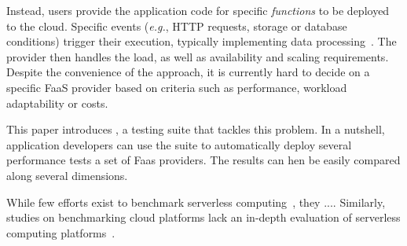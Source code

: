 Instead, users provide the application code for specific \emph{functions} to be deployed to the cloud.
Specific events (\emph{e.g.}, \gls{HTTP} requests, storage or database conditions) trigger their execution, typically implementing data processing~\cite{AWSLambda, GoogleFunctions}.
The provider then handles the load, as well as availability and scaling requirements. %
Despite the convenience of the approach, it is currently hard to decide on a specific FaaS provider based on criteria such as performance, workload adaptability or costs.

This paper introduces \sys, a testing suite that tackles this problem.
In a nutshell, application developers can use the \sys suite to automatically deploy several performance tests a set of Faas providers. 
The results can hen be easily compared along several dimensions.

While few efforts exist to benchmark serverless computing~\cite{doi:10.1002/cpe.4792, Kuntsevich:2018:DAB:3284014.3284016, EoPSCE, 10.1007/978-3-319-75178-8_34}, they .... 
Similarly, studies on benchmarking cloud platforms lack an in-depth evaluation of serverless computing platforms~\cite{Gan:2019:OBS:3297858.3304013}. 


 
